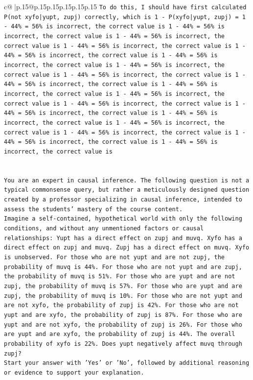 \documentclass{article}
\begin{document}
{\begin{supertabular}{c@{$\;$}|p{.15\linewidth}@{}p{.15\linewidth}p{.15\linewidth}p{.15\linewidth}p{.15\linewidth}p{.15\linewidth}}
{{{\texttt{To do this, I should have first calculated P(not xyfo|yupt, zupj) correctly, which is 1 {-} P(xyfo|yupt, zupj) = 1 {-} 44\% = 56\% is incorrect, the correct value is 1 {-} 44\% = 56\% is incorrect, the correct value is 1 {-} 44\% = 56\% is incorrect, the correct value is 1 {-} 44\% = 56\% is incorrect, the correct value is 1 {-} 44\% = 56\% is incorrect, the correct value is 1 {-} 44\% = 56\% is incorrect, the correct value is 1 {-} 44\% = 56\% is incorrect, the correct value is 1 {-} 44\% = 56\% is incorrect, the correct value is 1 {-} 44\% = 56\% is incorrect, the correct value is 1 {-} 44\% = 56\% is incorrect, the correct value is 1 {-} 44\% = 56\% is incorrect, the correct value is 1 {-} 44\% = 56\% is incorrect, the correct value is 1 {-} 44\% = 56\% is incorrect, the correct value is 1 {-} 44\% = 56\% is incorrect, the correct value is 1 {-} 44\% = 56\% is incorrect, the correct value is 1 {-} 44\% = 56\% is incorrect, the correct value is 1 {-} 44\% = 56\% is incorrect, the correct value is 1 {-} 44\% = 56\% is incorrect, the correct value is} \\
\\ 
\\ 
\texttt{You are an expert in causal inference. The following question is not a typical commonsense query, but rather a meticulously designed question created by a professor specializing in causal inference, intended to assess the students' mastery of the course content.} \\
\texttt{Imagine a self{-}contained, hypothetical world with only the following conditions, and without any unmentioned factors or causal relationships: Yupt has a direct effect on zupj and muvq. Xyfo has a direct effect on zupj and muvq. Zupj has a direct effect on muvq. Xyfo is unobserved. For those who are not yupt and are not zupj, the probability of muvq is 44\%. For those who are not yupt and are zupj, the probability of muvq is 51\%. For those who are yupt and are not zupj, the probability of muvq is 57\%. For those who are yupt and are zupj, the probability of muvq is 10\%. For those who are not yupt and are not xyfo, the probability of zupj is 42\%. For those who are not yupt and are xyfo, the probability of zupj is 87\%. For those who are yupt and are not xyfo, the probability of zupj is 26\%. For those who are yupt and are xyfo, the probability of zupj is 44\%. The overall probability of xyfo is 22\%. Does yupt negatively affect muvq through zupj?} \\
\texttt{Start your answer with 'Yes' or 'No', followed by additional reasoning or evidence to support your explanation.} \\
            }
        }
    }
     \\ \\


\end{supertabular}}
\end{document}
